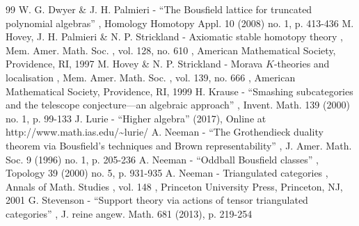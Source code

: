 \documentclass[10pt,a4paper]{article}
\numberwithin{equation}{section}
\theoremstyle{definition}
\begin{document}
\begin{thebibliography}{99}
 W. G. Dwyer \& J. H. Palmieri - “The Bousfield lattice for truncated polynomial algebras” , Homology Homotopy Appl. 10 (2008) no. 1, p. 413-436
 M. Hovey, J. H. Palmieri \& N. P. Strickland - Axiomatic stable homotopy theory , Mem. Amer. Math. Soc. , vol. 128, no. 610 , American Mathematical Society, Providence, RI, 1997
 M. Hovey \& N. P. Strickland - Morava $K$-theories and localisation , Mem. Amer. Math. Soc. , vol. 139, no. 666 , American Mathematical Society, Providence, RI, 1999
 H. Krause - “Smashing subcategories and the telescope conjecture—an algebraic approach” , Invent. Math. 139 (2000) no. 1, p. 99-133
 J. Lurie - “Higher algebra” (2017), Online at http://www.math.ias.edu/\textasciitilde{}lurie/
 A. Neeman - “The Grothendieck duality theorem via Bousfield’s techniques and Brown representability” , J. Amer. Math. Soc. 9 (1996) no. 1, p. 205-236
 A. Neeman - “Oddball Bousfield classes” , Topology 39 (2000) no. 5, p. 931-935
 A. Neeman - Triangulated categories , Annals of Math. Studies , vol. 148 , Princeton University Press, Princeton, NJ, 2001
 G. Stevenson - “Support theory via actions of tensor triangulated categories” , J. reine angew. Math. 681 (2013), p. 219-254
\end{thebibliography}
\end{document}
